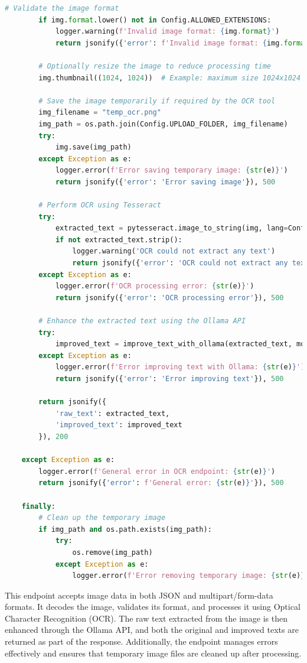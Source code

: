 \begin{lstlisting}[language=Python]
        # Validate the image format
        if img.format.lower() not in Config.ALLOWED_EXTENSIONS:
            logger.warning(f'Invalid image format: {img.format}')
            return jsonify({'error': f'Invalid image format: {img.format}'}), 400

        # Optionally resize the image to reduce processing time
        img.thumbnail((1024, 1024))  # Example: maximum size 1024x1024

        # Save the image temporarily if required by the OCR tool
        img_filename = "temp_ocr.png"
        img_path = os.path.join(Config.UPLOAD_FOLDER, img_filename)
        try:
            img.save(img_path)
        except Exception as e:
            logger.error(f'Error saving temporary image: {str(e)}')
            return jsonify({'error': 'Error saving image'}), 500

        # Perform OCR using Tesseract
        try:
            extracted_text = pytesseract.image_to_string(img, lang=Config.TESSERACT_LANG)
            if not extracted_text.strip():
                logger.warning('OCR could not extract any text')
                return jsonify({'error': 'OCR could not extract any text'}), 400
        except Exception as e:
            logger.error(f'OCR processing error: {str(e)}')
            return jsonify({'error': 'OCR processing error'}), 500

        # Enhance the extracted text using the Ollama API
        try:
            improved_text = improve_text_with_ollama(extracted_text, model='llama3.2')
        except Exception as e:
            logger.error(f'Error improving text with Ollama: {str(e)}')
            return jsonify({'error': 'Error improving text'}), 500

        return jsonify({
            'raw_text': extracted_text,
            'improved_text': improved_text
        }), 200

    except Exception as e:
        logger.error(f'General error in OCR endpoint: {str(e)}')
        return jsonify({'error': f'General error: {str(e)}'}), 500

    finally:
        # Clean up the temporary image
        if img_path and os.path.exists(img_path):
            try:
                os.remove(img_path)
            except Exception as e:
                logger.error(f'Error removing temporary image: {str(e)}')
\end{lstlisting}

This endpoint accepts image data in both JSON and multipart/form-data formats. It decodes the image, validates its format, and processes it using Optical Character Recognition (OCR). The raw text extracted from the image is then enhanced through the Ollama API, and both the original and improved texts are returned as part of the response. Additionally, the endpoint manages errors effectively and ensures that temporary image files are cleaned up after processing.

